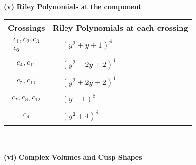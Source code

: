 \documentclass[1p]{elsarticle_modified}
\theoremstyle{definition}
\begin{document}
\newpage\renewcommand{\arraystretch}{1}
\flushleft \textbf{(v) Riley Polynomials at the component}\newline \\
\begin{tabular}{m{50pt}|m{274pt}}
Crossings & \hspace{64pt}Riley Polynomials at each crossing \\
\hline $$\begin{aligned}c_{1},c_{2},c_{3}\\c_{6}\end{aligned}$$&$\begin{aligned}
&(y^2+y+1)^4
\end{aligned}$\\
\hline $$\begin{aligned}c_{4},c_{11}\end{aligned}$$&$\begin{aligned}
&(y^2-2 y+2)^4
\end{aligned}$\\
\hline $$\begin{aligned}c_{5},c_{10}\end{aligned}$$&$\begin{aligned}
&(y^2+2 y+2)^4
\end{aligned}$\\
\hline $$\begin{aligned}c_{7},c_{8},c_{12}\end{aligned}$$&$\begin{aligned}
&(y-1)^8
\end{aligned}$\\
\hline $$\begin{aligned}c_{9}\end{aligned}$$&$\begin{aligned}
&(y^2+4)^4
\end{aligned}$\\
\hline
\end{tabular}\\~\\
\newpage\flushleft \textbf{(vi) Complex Volumes and Cusp Shapes}
\end{document}
